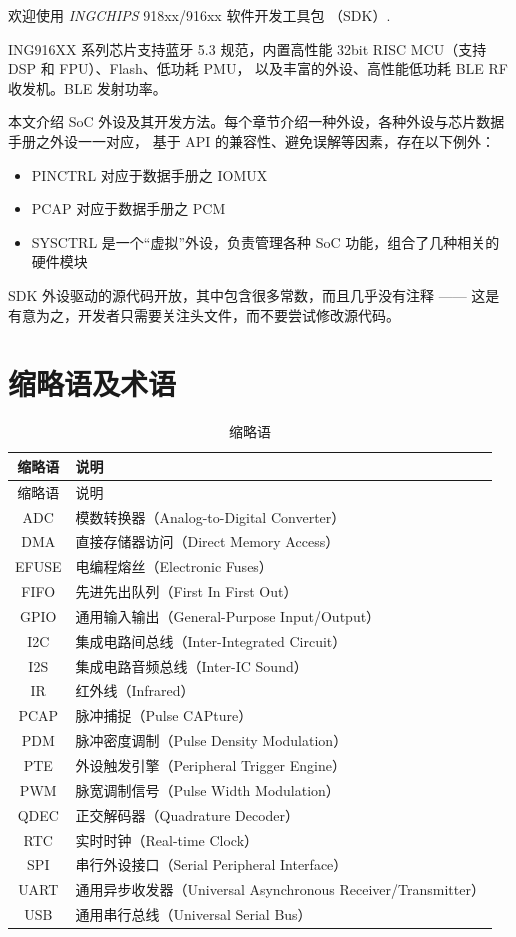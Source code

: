 \documentclass[
  12pt,
]{book}
\providecommand{\tightlist}{%
  \setlength{\itemsep}{0pt}\setlength{\parskip}{0pt}}
\begin{document}
欢迎使用 \emph{INGCHIPS} 918xx/916xx 软件开发工具包 （SDK）.

ING916XX 系列芯片支持蓝牙 5.3 规范，内置高性能 32bit RISC MCU（支持 DSP 和 FPU）、Flash、低功耗 PMU，
以及丰富的外设、高性能低功耗 BLE RF 收发机。BLE 发射功率。

本文介绍 SoC 外设及其开发方法。每个章节介绍一种外设，各种外设与芯片数据手册之外设一一对应，
基于 API 的兼容性、避免误解等因素，存在以下例外：

\begin{itemize}
\tightlist
\item
  PINCTRL 对应于数据手册之 IOMUX
\item
  PCAP 对应于数据手册之 PCM
\item
  SYSCTRL 是一个``虚拟''外设，负责管理各种 SoC 功能，组合了几种相关的硬件模块
\end{itemize}

SDK 外设驱动的源代码开放，其中包含很多常数，而且几乎没有注释 ------ 这是有意为之，开发者只需要关注头文件，而不要尝试修改源代码。

\hypertarget{ux7f29ux7565ux8bedux53caux672fux8bed}{%
\section{缩略语及术语}\label{ux7f29ux7565ux8bedux53caux672fux8bed}}

\begin{longtable}[]{@{}cl@{}}
\caption{\label{tab:ch0-abbreviations} 缩略语}\tabularnewline
\toprule
缩略语 & 说明\tabularnewline
\midrule
\endfirsthead
\toprule
缩略语 & 说明\tabularnewline
\midrule
\endhead
ADC & 模数转换器（Analog-to-Digital Converter）\tabularnewline
DMA & 直接存储器访问（Direct Memory Access）\tabularnewline
EFUSE & 电编程熔丝（Electronic Fuses）\tabularnewline
FIFO & 先进先出队列（First In First Out）\tabularnewline
GPIO & 通用输入输出（General-Purpose Input/Output）\tabularnewline
I2C & 集成电路间总线（Inter-Integrated Circuit）\tabularnewline
I2S & 集成电路音频总线（Inter-IC Sound）\tabularnewline
IR & 红外线（Infrared）\tabularnewline
PCAP & 脉冲捕捉（Pulse CAPture）\tabularnewline
PDM & 脉冲密度调制（Pulse Density Modulation）\tabularnewline
PTE & 外设触发引擎（Peripheral Trigger Engine）\tabularnewline
PWM & 脉宽调制信号（Pulse Width Modulation）\tabularnewline
QDEC & 正交解码器（Quadrature Decoder）\tabularnewline
RTC & 实时时钟（Real-time Clock）\tabularnewline
SPI & 串行外设接口（Serial Peripheral Interface）\tabularnewline
UART & 通用异步收发器（Universal Asynchronous Receiver/Transmitter）\tabularnewline
USB & 通用串行总线（Universal Serial Bus）\tabularnewline
\bottomrule
\end{longtable}
\end{document}
